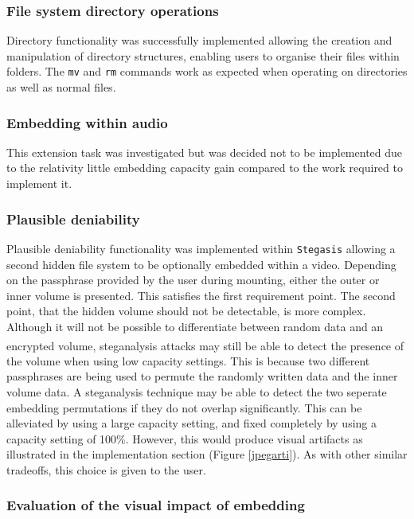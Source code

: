 \documentclass[paper=a4, fontsize=11pt,twoside]{scrartcl}
\numberwithin{table}{section}
\numberwithin{figure}{section}
\numberwithin{algorithm}{section}
\begin{document}
\subsubsection{File system directory operations}

Directory functionality was successfully implemented allowing the creation and manipulation of directory structures, enabling users to organise their files within folders. The \texttt{mv} and \texttt{rm} commands work as expected when operating on directories as well as normal files. 

\subsubsection{Embedding within audio}

This extension task was investigated but was decided not to be implemented due to the relativity little embedding capacity gain compared to the work required to implement it.

\subsubsection{Plausible deniability}

Plausible deniability functionality was implemented within \texttt{Stegasis} allowing a second hidden file system to be optionally embedded within a video. Depending on the passphrase provided by the user during mounting, either the outer or inner volume is presented. This satisfies the first requirement point. The second point, that the hidden volume should not be detectable, is more complex. Although it will not be possible to differentiate between random data and an encrypted volume\textsuperscript{\cite{random}}, steganalysis attacks may still be able to detect the presence of the volume when using low capacity settings. This is because two different passphrases are being used to permute the randomly written data and the inner volume data. A steganalysis technique may be able to detect the two seperate embedding permutations if they do not overlap significantly. This can be alleviated by using a large capacity setting, and fixed completely by using a capacity setting of 100\%. However, this would produce visual artifacts as illustrated in the implementation section (Figure \ref{jpegarti}). As with other similar tradeoffs, this choice is given to the user.

\subsubsection{Evaluation of the visual impact of embedding}
\end{document}
